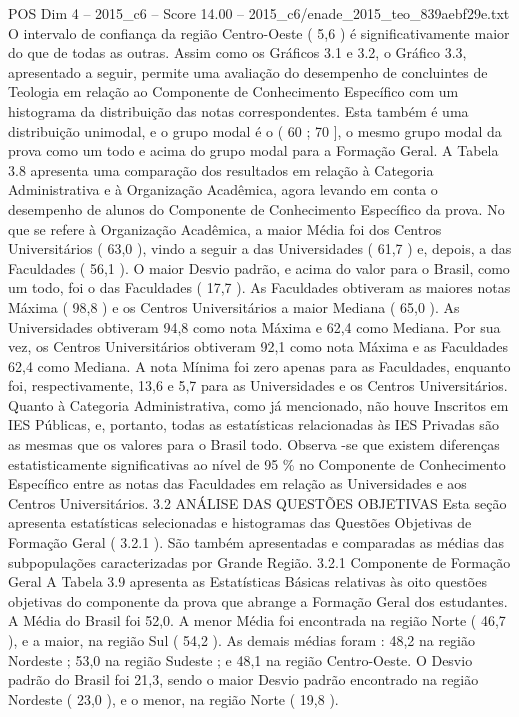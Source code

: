\begin{textsample}{POS Dim 4 – 2015\_c6 – Score 14.00 – 2015\_c6/enade\_2015\_teo\_839aebf29e.txt}
O intervalo de confiança da região Centro-Oeste ( 5,6 ) é significativamente maior do que de todas as outras.
Assim como os Gráficos 3.1 e 3.2, o Gráfico 3.3, apresentado a seguir, permite uma avaliação do desempenho de concluintes de Teologia em relação ao Componente de Conhecimento Específico com um histograma da distribuição das notas correspondentes.
Esta também é uma distribuição unimodal, e o grupo modal é o ( 60 ; 70 ], o mesmo grupo modal da prova como um todo e acima do grupo modal para a Formação Geral.
A Tabela 3.8 apresenta uma comparação dos resultados em relação à Categoria Administrativa e à Organização Acadêmica, agora levando em conta o desempenho de alunos do Componente de Conhecimento Específico da prova.
No que se refere à Organização Acadêmica, a maior Média foi dos Centros Universitários ( 63,0 ), vindo a seguir a das Universidades ( 61,7 ) e, depois, a das Faculdades ( 56,1 ).
O maior Desvio padrão, e acima do valor para o Brasil, como um todo, foi o das Faculdades ( 17,7 ).
As Faculdades obtiveram as maiores notas Máxima ( 98,8 ) e os Centros Universitários a maior Mediana ( 65,0 ).
As Universidades obtiveram 94,8 como nota Máxima e 62,4 como Mediana.
Por sua vez, os Centros Universitários obtiveram 92,1 como nota Máxima e as Faculdades 62,4 como Mediana.
A nota Mínima foi zero apenas para as Faculdades, enquanto foi, respectivamente, 13,6 e 5,7 para as Universidades e os Centros Universitários.
Quanto à Categoria Administrativa, como já mencionado, não houve Inscritos em IES Públicas, e, portanto, todas as estatísticas relacionadas às IES Privadas são as mesmas que os valores para o Brasil todo.
Observa -se que existem diferenças estatisticamente significativas ao nível de 95 \% no Componente de Conhecimento Específico entre as notas das Faculdades em relação as Universidades e aos Centros Universitários. 3.2 ANÁLISE DAS QUESTÕES OBJETIVAS Esta seção apresenta estatísticas selecionadas e histogramas das Questões Objetivas de Formação Geral ( 3.2.1 ).
São também apresentadas e comparadas as médias das subpopulações caracterizadas por Grande Região. 3.2.1 Componente de Formação Geral A Tabela 3.9 apresenta as Estatísticas Básicas relativas às oito questões objetivas do componente da prova que abrange a Formação Geral dos estudantes.
A Média do Brasil foi 52,0.
A menor Média foi encontrada na região Norte ( 46,7 ), e a maior, na região Sul ( 54,2 ).
As demais médias foram : 48,2 na região Nordeste ; 53,0 na região Sudeste ; e 48,1 na região Centro-Oeste.
O Desvio padrão do Brasil foi 21,3, sendo o maior Desvio padrão encontrado na região Nordeste ( 23,0 ), e o menor, na região Norte ( 19,8 ).

\end{textsample}
